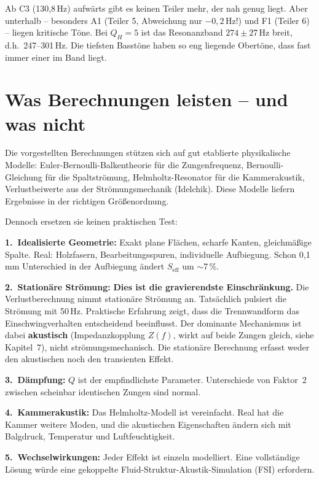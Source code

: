 \documentclass[11pt,a4paper]{article}
\begin{document}
Ab C3 (130{,}8\,Hz) aufwärts gibt es keinen Teiler mehr, der nah genug liegt. Aber unterhalb -- besonders A1 (Teiler 5, Abweichung nur $-0{,}2$\,Hz!) und F1 (Teiler 6) -- liegen kritische Töne. Bei $Q_H = 5$ ist das Resonanzband $274 \pm 27$\,Hz breit, d.h.\ 247--301\,Hz. Die tiefsten Basstöne haben so eng liegende Obertöne, dass fast immer einer im Band liegt.

\section{Was Berechnungen leisten -- und was nicht}

Die vorgestellten Berechnungen stützen sich auf gut etablierte physikalische Modelle: Euler-Bernoulli-Balkentheorie für die Zungenfrequenz, Bernoulli-Gleichung für die Spaltströmung, Helmholtz-Resonator für die Kammerakustik, Verlustbeiwerte aus der Strömungsmechanik (Idelchik). Diese Modelle liefern Ergebnisse in der richtigen Größenordnung.

Dennoch ersetzen sie keinen praktischen Test:

\textbf{1.\ Idealisierte Geometrie:} Exakt plane Flächen, scharfe Kanten, gleichmäßige Spalte. Real: Holzfasern, Bearbeitungsspuren, individuelle Aufbiegung. Schon 0{,}1\,mm Unterschied in der Aufbiegung ändert $S_\text{eff}$ um $\sim$7\,\%.

\textbf{2.\ Stationäre Strömung:} \textbf{Dies ist die gravierendste Einschränkung.} Die Verlustberechnung nimmt stationäre Strömung an. Tatsächlich pulsiert die Strömung mit 50\,Hz. Praktische Erfahrung zeigt, dass die Trennwandform das Einschwingverhalten entscheidend beeinflusst. Der dominante Mechanismus ist dabei \textbf{akustisch} (Impedanzkopplung $Z(f)$, wirkt auf beide Zungen gleich, siehe Kapitel~7), nicht strömungsmechanisch. Die stationäre Berechnung erfasst weder den akustischen noch den transienten Effekt.

\textbf{3.\ Dämpfung:} $Q$ ist der empfindlichste Parameter. Unterschiede von Faktor~2 zwischen scheinbar identischen Zungen sind normal.

\textbf{4.\ Kammerakustik:} Das Helmholtz-Modell ist vereinfacht. Real hat die Kammer weitere Moden, und die akustischen Eigenschaften ändern sich mit Balgdruck, Temperatur und Luftfeuchtigkeit.

\textbf{5.\ Wechselwirkungen:} Jeder Effekt ist einzeln modelliert. Eine vollständige Lösung würde eine gekoppelte Fluid-Struktur-Akustik-Simulation (FSI) erfordern.
\end{document}
